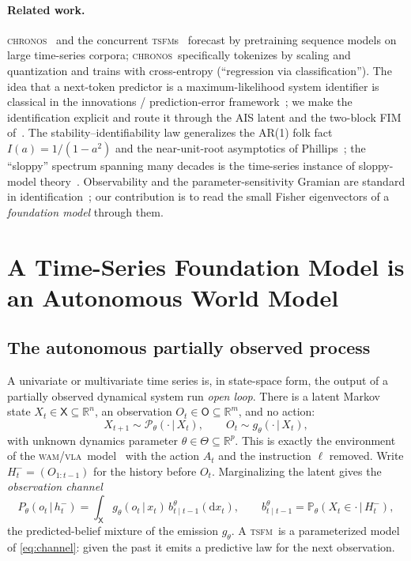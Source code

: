 \documentclass[10pt]{article}
\theoremstyle{plain}
\theoremstyle{definition}
\theoremstyle{remark}
\newcommand{\R}{\mathbb{R}}
\newcommand{\Prob}{\mathbb{P}}
\newcommand{\Os}{\mathsf{O}}
\newcommand{\Xs}{\mathsf{X}}
\newcommand{\given}{\,\vert\,}
\newcommand{\wm}{P_{\theta}}
\newcommand{\TSFM}{\textsc{tsfm}}
\newcommand{\WAM}{\textsc{wam}}
\newcommand{\VLA}{\textsc{vla}}
\newcommand{\Chronos}{\textsc{chronos}}
\begin{document}
\paragraph{Related work.}
\Chronos~\cite{chronos} and the concurrent \TSFM s~\cite{das2023,woo2024,%
rasul2023,goswami2024} forecast by pretraining sequence models on large time-series
corpora; \Chronos\ specifically tokenizes by scaling and quantization and trains
with cross-entropy (``regression via classification''). The idea that a
next-token predictor is a maximum-likelihood system identifier is classical in
the innovations / prediction-error framework~\cite{ljung1999,cappe2005}; we make
the identification explicit and route it through the AIS latent and the two-block
FIM of~\cite{wamvla}. The stability--identifiability law generalizes the AR(1)
folk fact $I(a)=1/(1-a^2)$ and the near-unit-root asymptotics of
Phillips~\cite{phillips1987}; the ``sloppy'' spectrum spanning many decades is
the time-series instance of sloppy-model
theory~\cite{transtrum2015,gutenkunst2007}. Observability and the
parameter-sensitivity Gramian are standard in
identification~\cite{ljung1999,bellman1970}; our contribution is to read the
small Fisher eigenvectors of a \emph{foundation model} through them.

\section{A Time-Series Foundation Model is an Autonomous World Model}
\label{sec:model}

\subsection{The autonomous partially observed process}
A univariate or multivariate time series is, in state-space form, the output of
a partially observed dynamical system run \emph{open loop}. There is a latent
Markov state $X_t\in\Xs\subseteq\R^n$, an observation $O_t\in\Os\subseteq\R^m$,
and no action:
\begin{equation}
 X_{t+1}\sim\mathcal P_\theta(\cdot\given X_t),\qquad
 O_t\sim g_\theta(\cdot\given X_t),
 \label{eq:auto}
\end{equation}
with unknown dynamics parameter $\theta\in\Theta\subseteq\R^p$. This is exactly
the environment of the \WAM/\VLA\ model~\cite[\S2]{wamvla} with the action $A_t$
and the instruction $\ell$ removed. Write $H_t^-=(O_{1:t-1})$ for the history
before $O_t$. Marginalizing the latent gives the \emph{observation channel}
\begin{equation}
 \wm(o_t\given h_t^-)=\int_\Xs g_\theta(o_t\given x_t)\,
   b_{t\mid t-1}^\theta(\mathrm dx_t),\qquad
 b_{t\mid t-1}^\theta=\Prob_\theta(X_t\in\cdot\given H_t^-),
 \label{eq:channel}
\end{equation}
the predicted-belief mixture of the emission $g_\theta$. A \TSFM\ is a
parameterized model of \eqref{eq:channel}: given the past it emits a predictive
law for the next observation.
\end{document}
